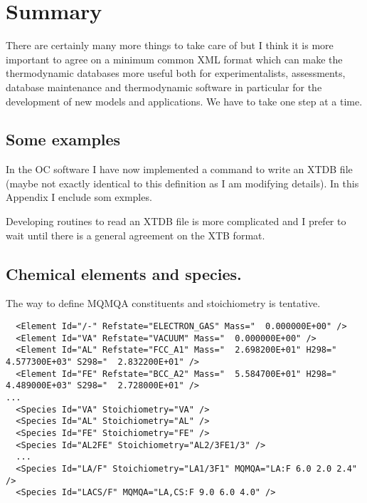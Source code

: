 \documentclass{article}
\begin{document}
\section{Summary}

There are certainly many more things to take care of but I think it is
more important to agree on a minimum common XML format which can make
the thermodynamic databases more useful both for experimentalists,
assessments, database maintenance and thermodynamic software in
particular for the development of new models and applications.  We
have to take one step at a time.

\newpage 

\newpage
\begin{appendices}
\setcounter{equation}{0}
\renewcommand{\theequation}{A\arabic{equation}}
\setcounter{figure}{0}
\renewcommand{\thefigure}{A\arabic{figure}}

\section{Some examples}\label{sec:examples}

In the OC software I have now implemented a command to write an XTDB
file (maybe not exactly identical to this definition as I am modifying
details).  In this Appendix I enclude som exmples.

Developing routines to read an XTDB file is more complicated and I
prefer to wait until there is a general agreement on the XTB format.

\subsection{Chemical elements and species.}\label{sec:elementexample}

The way to define MQMQA constituents and stoichiometry is tentative.

{\small
\begin{verbatim}
  <Element Id="/-" Refstate="ELECTRON_GAS" Mass="  0.000000E+00" />
  <Element Id="VA" Refstate="VACUUM" Mass="  0.000000E+00" />
  <Element Id="AL" Refstate="FCC_A1" Mass="  2.698200E+01" H298="  4.577300E+03" S298="  2.832200E+01" />
  <Element Id="FE" Refstate="BCC_A2" Mass="  5.584700E+01" H298="  4.489000E+03" S298="  2.728000E+01" />
...
  <Species Id="VA" Stoichiometry="VA" />
  <Species Id="AL" Stoichiometry="AL" />
  <Species Id="FE" Stoichiometry="FE" />
  <Species Id="AL2FE" Stoichiometry="AL2/3FE1/3" />
  ...
  <Species Id="LA/F" Stoichiometry="LA1/3F1" MQMQA="LA:F 6.0 2.0 2.4" />
  <Species Id="LACS/F" MQMQA="LA,CS:F 9.0 6.0 4.0" />
\end{verbatim}
}


\end{appendices}
\end{document}
